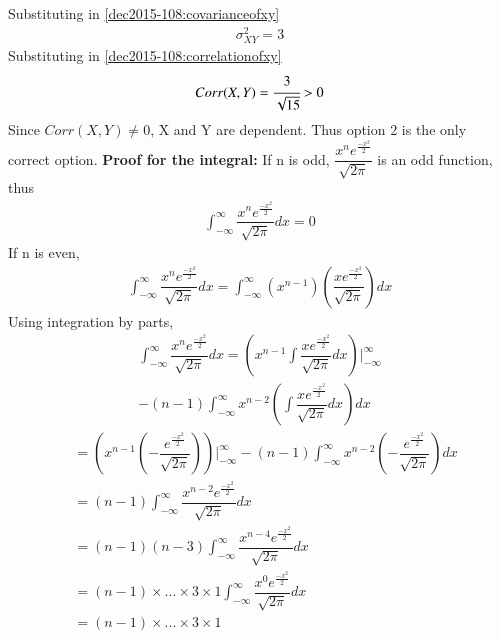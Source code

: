 Substituting in \eqref{dec2015-108:covarianceofxy}
\begin{align}
    \sigma_{XY}^2 = 3
\end{align}
Substituting in \eqref{dec2015-108:correlationofxy}
\begin{align}
    Corr(X,Y) = \cfrac{3}{\sqrt{15}} > 0
\end{align}
Since $Corr(X,Y) \ne 0$, X and Y are dependent. Thus option 2 is the only correct option.
\textbf{Proof for the integral:}
If n is odd, $\dfrac{x^n e^{\frac{-x^2}{2}}}{\sqrt{2\pi}}$ is an odd function, thus
\begin{align}
    \int_{-\infty}^{\infty} \dfrac{x^n e^{\frac{-x^2}{2}}}{\sqrt{2\pi}}dx = 0
\end{align}
If n is even, 
\begin{align}
    \int_{-\infty}^{\infty} \dfrac{x^n e^{\frac{-x^2}{2}}}{\sqrt{2\pi}}dx = \int_{-\infty}^{\infty} (x^{n-1}) (\dfrac{x e^{\frac{-x^2}{2}}}{\sqrt{2\pi}})dx
\end{align}
Using integration by parts,
\begin{multline}
    \int_{-\infty}^{\infty} \dfrac{x^n e^{\frac{-x^2}{2}}}{\sqrt{2\pi}}dx = \left(x^{n-1}\int \dfrac{x e^{\frac{-x^2}{2}}}{\sqrt{2\pi}}dx\right)\biggr \vert_{-\infty}^{\infty}\\
       - (n-1)\int_{-\infty}^{\infty}x^{n-2}\left(\int \dfrac{x e^{\frac{-x^2}{2}}}{\sqrt{2\pi}}dx\right) dx
\end{multline}
\begin{align}
    &= \left(x^{n-1}(-\dfrac{e^{\frac{-x^2}{2}}}{\sqrt{2\pi}})\right)\biggr \vert_{-\infty}^{\infty}
           - (n-1)\int_{-\infty}^{\infty}x^{n-2}(-\dfrac{e^{\frac{-x^2}{2}}}{\sqrt{2\pi}}) dx\\
    &= (n-1)\int_{-\infty}^{\infty} \dfrac{x^{n-2} e^{\frac{-x^2}{2}}}{\sqrt{2\pi}}dx\\
    &= (n-1)(n-3)\int_{-\infty}^{\infty} \dfrac{x^{n-4} e^{\frac{-x^2}{2}}}{\sqrt{2\pi}}dx\\
    &= (n-1)\times...\times3\times1\int_{-\infty}^{\infty} \dfrac{x^0 e^{\frac{-x^2}{2}}}{\sqrt{2\pi}}dx\\
    &= (n-1)\times...\times3\times1
\end{align}
